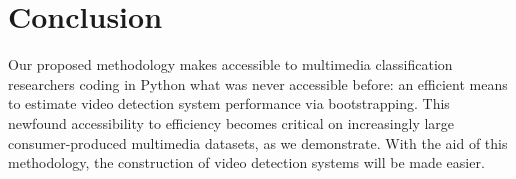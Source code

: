 \section{Conclusion}

Our proposed methodology makes accessible to multimedia classification researchers coding in Python what was never accessible before: an efficient means to estimate video detection system performance via bootstrapping.
This newfound accessibility to efficiency becomes critical on increasingly large consumer-produced multimedia datasets, as we demonstrate. 
With the aid of this methodology, the construction of video detection systems will be made easier.




